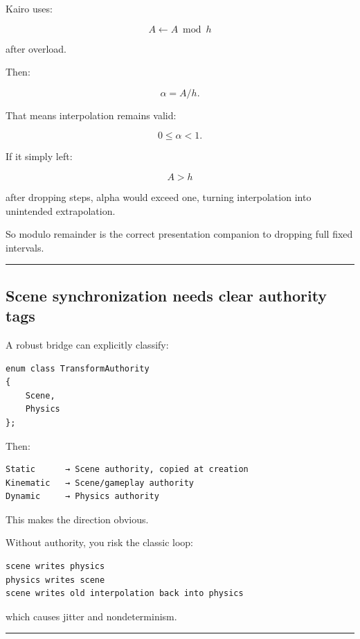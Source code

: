 Kairo uses:

\[
A\leftarrow A\bmod h
\]

after overload.

Then:

\[
\alpha=A/h.
\]

That means interpolation remains valid:

\[
0\le\alpha<1.
\]

If it simply left:

\[
A>h
\]

after dropping steps, alpha would exceed one, turning interpolation into unintended extrapolation.

So modulo remainder is the correct presentation companion to dropping full fixed intervals.

\begin{center}\rule{0.5\linewidth}{0.5pt}\end{center}

\subsection{Scene synchronization needs clear authority tags}\label{06-engine-ii-ch038-scene-synchronization-needs-clear-authority-tags}

\hypertarget{06-engine-ii-ch038-scene-synchronization-needs-clear-authority-tags}{}

A robust bridge can explicitly classify:

\begin{verbatim}
enum class TransformAuthority
{
    Scene,
    Physics
};
\end{verbatim}

Then:

\begin{verbatim}
Static      → Scene authority, copied at creation
Kinematic   → Scene/gameplay authority
Dynamic     → Physics authority
\end{verbatim}

This makes the direction obvious.

Without authority, you risk the classic loop:

\begin{verbatim}
scene writes physics
physics writes scene
scene writes old interpolation back into physics
\end{verbatim}

which causes jitter and nondeterminism.

\begin{center}\rule{0.5\linewidth}{0.5pt}\end{center}

